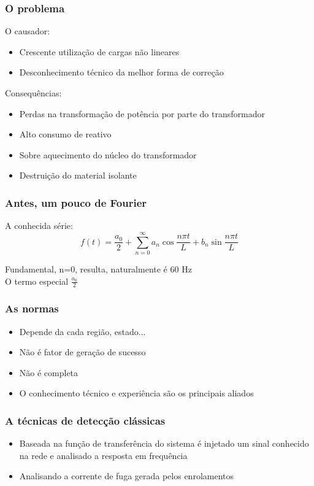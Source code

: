 \documentclass{beamer}
\begin{document}
\begin{frame}
    \frametitle{O problema}

    O causador:
    \begin{itemize}
        \item Crescente utilização de cargas não lineares
        \item Desconhecimento técnico da melhor forma de correção
    \end{itemize}

    Consequências:
    \begin{itemize}
        \item Perdas na transformação de potência por parte do transformador
        \item Alto consumo de reativo
        \item Sobre aquecimento do núcleo do transformador
        \item Destruição do material isolante
    \end{itemize}

\end{frame}

\begin{frame}
    \frametitle{Antes, um pouco de Fourier}

    A conhecida série:
    \begin{equation}
        f(t) = \frac{a_0}{2} + \sum_{n=0}^\infty{a_n \cos{\frac{n \pi t}{L} + b_n \sin{\frac{n \pi t}{L}}}}
    \end{equation}

    Fundamental, n=0, resulta, naturalmente é 60 Hz\\
    O termo especial $\frac{a_0}{2}$
\end{frame}

\begin{frame}
    \frametitle{As normas}
    
    \begin{itemize}
        \item Depende da cada região, estado...
        \item Não é fator de geração de sucesso
        \item Não é completa
        \item O conhecimento técnico e experiência são os principais aliados
    \end{itemize}

\end{frame}

\begin{frame}
    \frametitle{A técnicas de detecção clássicas}

    \begin{itemize}
        \item Baseada na função de transferência do sistema é injetado um sinal conhecido na rede e analisado a resposta em frequência
        \item Analisando a corrente de fuga gerada pelos enrolamentos
    \end{itemize}
\end{frame}
   
\end{document}
